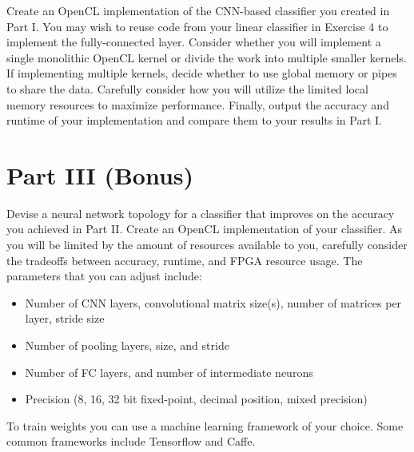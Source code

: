 \documentclass[epsfig,10pt,fullpage]{article}
\newcommand{\CommonDocsPath}{../../common/docs}
\begin{document}
Create an OpenCL implementation of the CNN-based classifier you created in Part I. You may wish to reuse code from your linear classifier in Exercise 4 to implement the fully-connected layer. Consider whether you will implement a single monolithic OpenCL kernel or divide the work into multiple smaller kernels. If implementing multiple kernels, decide whether to use global memory or pipes to share the data. Carefully consider how you will utilize the limited local memory resources to maximize performance.
Finally, output the accuracy and runtime of your implementation and compare them to your results in Part I.

\section*{Part III (Bonus)}

Devise a neural network topology for a classifier that improves on the accuracy you achieved in Part II. 
Create an OpenCL implementation of your classifier. As you will be limited by the amount of resources available to you, 
carefully consider the tradeoffs between accuracy, runtime, and FPGA resource usage. 
The parameters that you can adjust include:

\begin{itemize}
\item Number of CNN layers, convolutional matrix size(s), number of matrices per layer, stride size
\item Number of pooling layers, size, and stride
\item Number of FC layers, and number of intermediate neurons
\item Precision (8, 16, 32 bit fixed-point, decimal position, mixed precision)
\end{itemize}

To train weights you can use a machine learning framework of your choice. Some common frameworks include Tensorflow and Caffe. 


\end{document}

